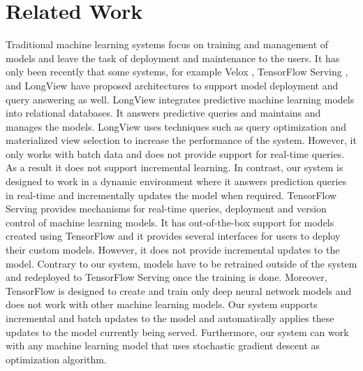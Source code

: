 \documentclass{vldb}
\begin{document}
\section{Related Work} \label{related-work}
Traditional machine learning systems focus on training and management of models and leave the task of deployment and maintenance to the users. 
It has only been recently that some systems, for example Velox \cite{crankshaw2014missing}, TensorFlow Serving \cite{abadi2016tensorflow}, and LongView \cite{akdere2011case} have proposed architectures to support model deployment and query answering as well. 
LongView integrates predictive machine learning models into relational databases. 
It answers predictive queries and maintains and manages the models.
LongView uses techniques such as query optimization and materialized view selection to increase the performance of the system.
However, it only works with batch data and does not provide support for real-time queries. 
As a result it does not support incremental learning.
In contrast, our system is designed to work in a dynamic environment where it answers prediction queries in real-time and incrementally updates the model when required.
TensorFlow Serving provides mechanisms for real-time queries, deployment and version control of machine learning models.
It has out-of-the-box support for models created using TensorFlow and it provides several interfaces for users to deploy their custom models.
However, it does not provide incremental updates to the model.
Contrary to our system, models have to be retrained outside of the system and redeployed to TensorFlow Serving once the training is done.
Moreover, TensorFlow is designed to create and train only deep neural network models and does not work with other machine learning models.
Our system supports incremental and batch updates to the model and automatically applies these updates to the model currently being served.
Furthermore, our system can work with any machine learning model that uses stochastic gradient descent as optimization algorithm.
\end{document}
